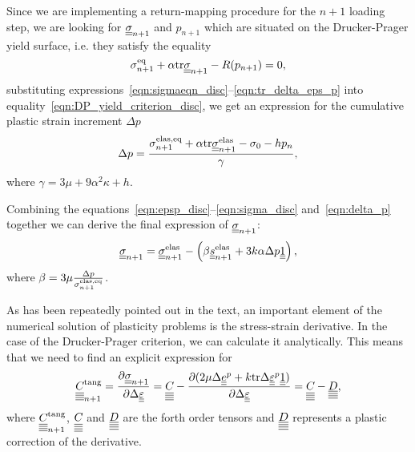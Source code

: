 \documentclass[12pt]{article}
\begin{document}
\begin{appendices}
    Since we are implementing a return-mapping procedure for the $n + 1$ loading step, we are looking for $\underline{\underline{\sigma}}_{n+1}$ and $p_{n+1}$ which are situated on the Drucker-Prager yield surface, i.e. they satisfy the equality 
    \begin{equation}\label{eqn:DP_yield_criterion_disc}
        \sigma_{n+1}^\text{eq} + \alpha \mathrm{tr} \underline{\underline{\sigma}}_{n+1} - R(p_{n+1}) = 0,
    \end{equation}
    substituting expressions~\eqref{eqn:sigmaeqn_disc}--\eqref{eqn:tr_delta_eps_p} into equality~\eqref{eqn:DP_yield_criterion_disc}, we get an expression for the cumulative plastic strain increment $\Delta p$
    \begin{equation}\label{eqn:delta_p}
        \Delta p = \frac{ \sigma_{n+1}^\text{elas,eq} + \alpha \mathrm{tr} \underline{\underline{\sigma}}_{n+1}^{\text{elas}} - \sigma_0 - h p_n}{ \gamma },
    \end{equation}
    where $\gamma = 3\mu + 9\alpha^2\kappa + h$.
    
    Combining the equations~\eqref{eqn:epsp_disc}--\eqref{eqn:sigma_disc} and~\eqref{eqn:delta_p} together we can derive the final expression of $\underline{\underline{\sigma}}_{n+1}$:
    \begin{equation}
        \underline{\underline{\sigma}}_{n+1} = \underline{\underline{\sigma}}_{n+1}^\text{elas} - \left( \beta \underline{\underline{s}}_{n+1}^\text{elas} + 3k\alpha \Delta p \underline{\underline{1}} \right),
    \end{equation}
    where $\beta = 3\mu\frac{\Delta p}{\sigma_{n+1}^\text{elas,eq}}$.

    As has been repeatedly pointed out in the text, an important element of the numerical solution of plasticity problems is the stress-strain derivative. In the case of the Drucker-Prager criterion, we can calculate it analytically. This means that we need to find an explicit expression for 
    \begin{equation*}
        \underline{\underline{\underline{\underline{C_{}}}}}^\text{tang}_{n+1} = \frac{\partial\underline{\underline{\sigma}}_{n+1}}{\partial \Delta\underline{\underline{\varepsilon}}} = \underline{\underline{\underline{\underline{C_{}}}}} - \frac{\partial (2\mu\Delta\underline{\underline{e}}^p + k\mathrm{tr}\Delta\underline{\underline{\varepsilon}}^p\underline{\underline{1}})}{\partial\Delta\underline{\underline{\varepsilon}}} = \underline{\underline{\underline{\underline{C_{}}}}} - \underline{\underline{\underline{\underline{D}}}},
    \end{equation*}
    where $\underline{\underline{\underline{\underline{C_{}}}}}^\text{tang}_{n+1}$, $\underline{\underline{\underline{\underline{C_{}}}}}$ and $\underline{\underline{\underline{\underline{D}}}}$ are the forth order tensors and $\underline{\underline{\underline{\underline{D}}}}$ represents a plastic correction of the derivative.
    

\end{appendices}
\end{document}
